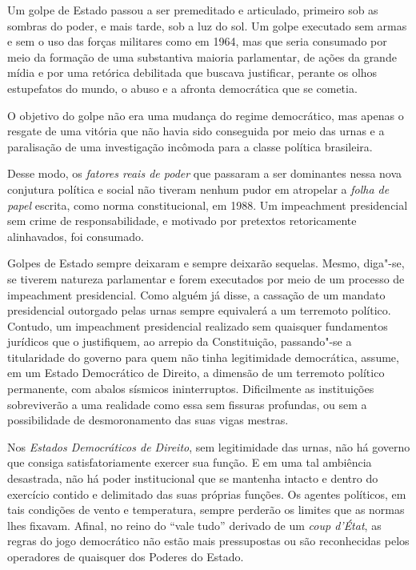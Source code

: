 Um golpe de Estado passou a ser premeditado e articulado, primeiro sob
as sombras do poder, e mais tarde, sob a luz do sol. Um golpe executado
sem armas e sem o uso das forças militares como em 1964, mas que seria
consumado por meio da formação de uma substantiva maioria parlamentar,
de ações da grande mídia e por uma retórica debilitada que buscava
justificar, perante os olhos estupefatos do mundo, o abuso e a afronta
democrática que se cometia.

O objetivo do golpe não era uma mudança do regime democrático, mas
apenas o resgate de uma vitória que não havia sido conseguida por meio
das urnas e a paralisação de uma investigação incômoda para a classe
política brasileira.

Desse modo, os \emph{fatores reais de poder} que passaram a ser
dominantes nessa nova conjutura política e social não tiveram nenhum
pudor em atropelar a \emph{folha de papel} escrita, como norma
constitucional, em 1988. Um impeachment presidencial sem crime de
responsabilidade, e motivado por pretextos retoricamente alinhavados,
foi consumado.

Golpes de Estado sempre deixaram e sempre deixarão sequelas. Mesmo,
diga"-se, se tiverem natureza parlamentar e forem executados por meio de
um processo de impeachment presidencial. Como alguém já disse, a
cassação de um mandato presidencial outorgado pelas urnas sempre
equivalerá a um terremoto político. Contudo, um impeachment
presidencial realizado sem quaisquer fundamentos jurídicos que o
justifiquem, ao arrepio da Constituição, passando"-se a titularidade do
governo para quem não tinha legitimidade democrática, assume, em um
Estado Democrático de Direito, a dimensão de um terremoto político
permanente, com abalos sísmicos ininterruptos. Dificilmente as
instituições sobreviverão a uma realidade como essa sem fissuras
profundas, ou sem a possibilidade de desmoronamento das suas vigas
mestras.

Nos \emph{Estados Democráticos de Direito}, sem legitimidade das urnas,
não há governo que consiga satisfatoriamente exercer sua função. E em
uma tal ambiência desastrada, não há poder institucional que se mantenha
intacto e dentro do exercício contido e delimitado das suas próprias
funções. Os agentes políticos, em tais condições de vento e temperatura,
sempre perderão os limites que as normas lhes fixavam. Afinal, no reino
do ``vale tudo'' derivado de um \emph{coup d'État}, as regras do
jogo democrático não estão mais pressupostas ou são reconhecidas pelos
operadores de quaisquer dos Poderes do Estado.

